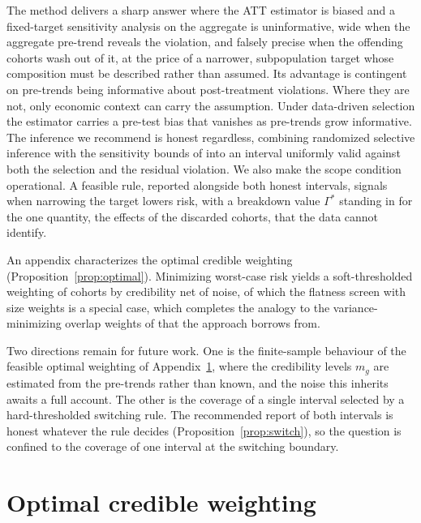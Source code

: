 \documentclass[12pt]{article}
\theoremstyle{remark}
\begin{document}
The method delivers a sharp answer where the ATT estimator is biased and a fixed-target sensitivity
analysis on the aggregate is uninformative, wide when the aggregate pre-trend reveals the violation, and
falsely precise when the offending cohorts wash out of it, at the price of a narrower, subpopulation target
whose composition must be described rather than assumed. Its advantage is contingent on pre-trends being informative about post-treatment violations.
Where they are not, only economic context can carry the assumption. Under data-driven selection the
estimator carries a pre-test bias that vanishes as pre-trends grow informative. The inference we
recommend is honest regardless, combining randomized selective inference \citep{fithian2014, tiantaylor2018}
with the sensitivity bounds of \citet{rambachan2023} into an interval uniformly valid against both the
selection and the residual violation. We also make the scope condition operational. A feasible rule, reported alongside both honest
intervals, signals when narrowing the target lowers risk, with a breakdown value $\Gamma^\ast$ standing in
for the one quantity, the effects of the discarded cohorts, that the data cannot identify.

An appendix characterizes the optimal credible weighting (Proposition~\ref{prop:optimal}). Minimizing
worst-case risk yields a soft-thresholded weighting of cohorts by credibility net of noise, of which the
flatness screen with size weights is a special case, which completes the analogy to the variance-minimizing
overlap weights of \citet{crump2009} that the approach borrows from.

Two directions remain for future work. One is the finite-sample behaviour of the feasible optimal weighting
of Appendix~\ref{sec:optimal}, where the credibility levels $m_g$ are estimated from the pre-trends rather
than known, and the noise this inherits awaits a full account. The other is the coverage of a single
interval selected by a hard-thresholded switching rule. The recommended report of both intervals is honest
whatever the rule decides (Proposition~\ref{prop:switch}), so the question is confined to the coverage of one
interval at the switching boundary.

\clearpage



\clearpage
\appendix

\section{Optimal credible weighting}\label{sec:optimal}
\end{document}
